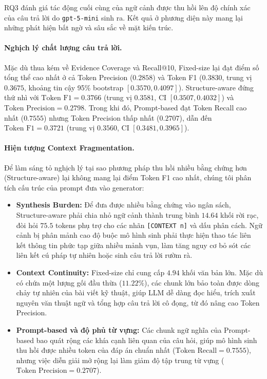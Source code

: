 RQ3 đánh giá tác động cuối cùng của ngữ cảnh được thu hồi lên độ chính xác của câu trả lời do \texttt{gpt-5-mini} sinh ra. Kết quả ở phương diện này mang lại những phát hiện bất ngờ và sâu sắc về mặt kiến trúc.

\paragraph{Nghịch lý chất lượng câu trả lời.}
Mặc dù thua kém về Evidence Coverage và Recall@10, Fixed-size lại đạt điểm số tổng thể cao nhất ở cả Token Precision ($0.2858$) và Token F1 ($0.3830$, trung vị $0.3675$, khoảng tin cậy 95\% bootstrap $[0.3570, 0.4097]$). Structure-aware đứng thứ nhì với $\text{Token F1} = 0.3766$ (trung vị $0.3581$, CI $[0.3507, 0.4032]$) và $\text{Token Precision} = 0.2798$. Trong khi đó, Prompt-based đạt Token Recall cao nhất ($0.7555$) nhưng Token Precision thấp nhất ($0.2707$), dẫn đến $\text{Token F1} = 0.3721$ (trung vị $0.3560$, CI $[0.3481, 0.3965]$).

\paragraph{Hiện tượng Context Fragmentation.}
Để làm sáng tỏ nghịch lý tại sao phương pháp thu hồi nhiều bằng chứng hơn (Structure-aware) lại không mang lại điểm Token F1 cao nhất, chúng tôi phân tích cấu trúc của prompt đưa vào generator:
\begin{itemize}
    \item \textbf{Synthesis Burden:} Để đưa được nhiều bằng chứng vào ngân sách, Structure-aware phải chia nhỏ ngữ cảnh thành trung bình $14.64$ khối rời rạc, đòi hỏi $75.5$ tokens phụ trợ cho các nhãn \texttt{[CONTEXT n]} và dấu phân cách. Ngữ cảnh bị phân mảnh cao độ buộc mô hình sinh phải thực hiện thao tác liên kết thông tin phức tạp giữa nhiều mảnh vụn, làm tăng nguy cơ bỏ sót các liên kết cú pháp tự nhiên hoặc sinh câu trả lời rườm rà.
    \item \textbf{Context Continuity:} Fixed-size chỉ cung cấp $4.94$ khối văn bản lớn. Mặc dù có chứa một lượng gối đầu thừa ($11.22\%$), các chunk lớn bảo toàn được dòng chảy tự nhiên của bài viết kỹ thuật, giúp LLM dễ dàng đọc hiểu, trích xuất nguyên văn thuật ngữ và tổng hợp câu trả lời cô đọng, từ đó nâng cao Token Precision.
    \item \textbf{Prompt-based và độ phủ từ vựng:} Các chunk ngữ nghĩa của Prompt-based bao quát rộng các khía cạnh liên quan của câu hỏi, giúp mô hình sinh thu hồi được nhiều token của đáp án chuẩn nhất ($\text{Token Recall} = 0.7555$), nhưng việc diễn giải mở rộng lại làm giảm độ tập trung từ vựng ($\text{Token Precision} = 0.2707$).
\end{itemize}

